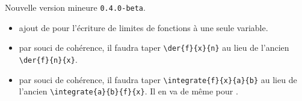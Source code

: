 Nouvelle version mineure \verb+0.4.0-beta+.

\begin{itemize}[itemsep=.5em]
    \item {}
          ajout de  pour l'écriture de limites de fonctions à une seule variable.


    \item {}
          par souci de cohérence, il faudra taper \verb#\der{f}{x}{n}# au lieu de l'ancien \verb#\der{f}{n}{x}#.


    \item {}
          par souci de cohérence, il faudra taper \verb#\integrate{f}{x}{a}{b}# au lieu de l'ancien \verb#\integrate{a}{b}{f}{x}#.
          Il en va de même pour .


    \separation
\end{itemize}
